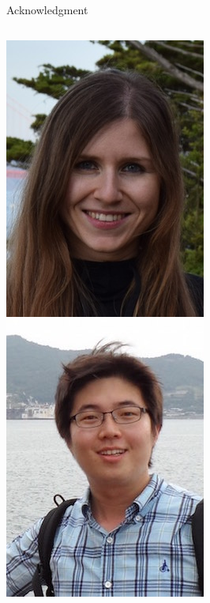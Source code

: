 \begin{frame}{Acknowledgment}
  \begin{columns}
    \includegraphics[width=0.9\linewidth]{figures/akkaya.jpg}
    \includegraphics[width=0.9\linewidth]{figures/kim.jpg}


\end{columns}
\end{frame}
